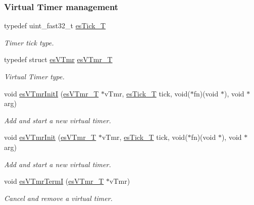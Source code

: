 \subsubsection*{Virtual Timer management}
\begin{DoxyCompactItemize}
\item 
typedef uint\-\_\-fast32\-\_\-t \hyperlink{group__kern__intf_ga844873888c186ee81eb66620dadb0451}{es\-Tick\-\_\-\-T}
\begin{DoxyCompactList}\small\item\em Timer tick type. \end{DoxyCompactList}\item 
typedef struct \hyperlink{structesVTmr}{es\-V\-Tmr} \hyperlink{group__kern__intf_ga3c020f0ca54ff412bc1d1505502d2afc}{es\-V\-Tmr\-\_\-\-T}
\begin{DoxyCompactList}\small\item\em Virtual Timer type. \end{DoxyCompactList}\item 
void \hyperlink{group__kern__intf_ga45fe650eac73e7fe203cc81565401555}{es\-V\-Tmr\-Init\-I} (\hyperlink{group__kern__intf_ga3c020f0ca54ff412bc1d1505502d2afc}{es\-V\-Tmr\-\_\-\-T} $\ast$v\-Tmr, \hyperlink{group__kern__intf_ga844873888c186ee81eb66620dadb0451}{es\-Tick\-\_\-\-T} tick, void($\ast$fn)(void $\ast$), void $\ast$arg)
\begin{DoxyCompactList}\small\item\em Add and start a new virtual timer. \end{DoxyCompactList}\item 
void \hyperlink{group__kern__intf_gad932cf00aec4ba03a0df02ccc493c4c2}{es\-V\-Tmr\-Init} (\hyperlink{group__kern__intf_ga3c020f0ca54ff412bc1d1505502d2afc}{es\-V\-Tmr\-\_\-\-T} $\ast$v\-Tmr, \hyperlink{group__kern__intf_ga844873888c186ee81eb66620dadb0451}{es\-Tick\-\_\-\-T} tick, void($\ast$fn)(void $\ast$), void $\ast$arg)
\begin{DoxyCompactList}\small\item\em Add and start a new virtual timer. \end{DoxyCompactList}\item 
void \hyperlink{group__kern__intf_ga96bb2c81f649c0305dfd08d1c79b2e37}{es\-V\-Tmr\-Term\-I} (\hyperlink{group__kern__intf_ga3c020f0ca54ff412bc1d1505502d2afc}{es\-V\-Tmr\-\_\-\-T} $\ast$v\-Tmr)
\begin{DoxyCompactList}\small\item\em Cancel and remove a virtual timer. \end{DoxyCompactList}\item 

\end{DoxyCompactItemize}
